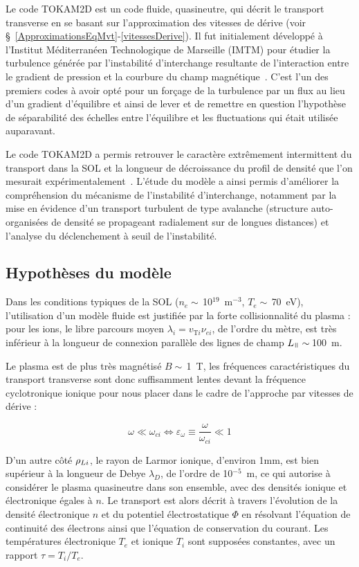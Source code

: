 \begin{refsection}
Le code TOKAM2D est un code fluide, quasineutre, qui décrit le transport
transverse en se basant sur l'approximation des vitesses de dérive (voir
\S~\ref{ApproximationsEqMvt}-\ref{vitessesDerive}). Il fut initialement
développé à l'Institut Méditerranéen Technologique de Marseille (IMTM) pour
étudier la turbulence générée par l'instabilité d'interchange resultante de
l'interaction entre le gradient de pression et la courbure du champ
magnétique~\parencite{Garbet}. C'est l'un des premiers codes à avoir opté pour
un forçage de la turbulence par un flux au lieu d'un gradient d'équilibre et
ainsi de lever et de remettre en question l'hypothèse de séparabilité
des échelles entre l'équilibre et les fluctuations qui était utilisée auparavant.

Le code TOKAM2D a permis retrouver le caractère extrêmement intermittent du
transport dans la SOL et la longueur de décroissance du profil de densité que l'on
mesurait expérimentalement~\cite{SarazinPhD}. L'étude du modèle a ainsi permis
d'améliorer la compréhension du mécanisme de l'instabilité d'interchange,
notamment par la mise en évidence d'un transport turbulent de type avalanche
(structure auto-organisées de densité se propageant radialement sur de longues
distances) et l'analyse du déclenchement à seuil de l'instabilité.

\subsection{Hypothèses du modèle}
Dans les conditions typiques de la SOL ($n_e\sim\,$10$^{19}$~m$^{-3}$,
$T_e\sim\,$70~eV), l'utilisation d'un modèle fluide est justifiée par la forte
collisionnalité du plasma : pour les ions, le libre parcours moyen
$\lambda_i=v_{\text{T}{i}} \nu_{ei}$, de l'ordre du mètre, est très
inférieur à la longueur de connexion parallèle des lignes de champ
$L_\para\sim\,$100~m.

Le plasma est de plus très magnétisé $B\sim\,$1~T, les fréquences
caractéristiques du transport transverse sont donc suffisamment lentes devant la
fréquence cyclotronique ionique pour nous placer dans le cadre de
l'approche par vitesses de dérive :

\begin{equation}
\omega\ll\omega_{ci}\Leftrightarrow
\varepsilon_\omega\equiv\frac{\omega}{\omega_{ci}}\ll 1
\end{equation}

D'un autre côté $\rho{_{Li}}$, le rayon de Larmor ionique, d'environ
1mm, est bien supérieur à la longueur de
Debye $\lambda_D$, de l'ordre de 10$^{-5}$~m, ce qui autorise à
considérer le plasma quasineutre dans son ensemble, avec des densités ionique
et électronique égales à $n$.
Le transport est alors décrit à travers l'évolution de la densité
électronique $n$ et du potentiel électrostatique $\Phi$ en résolvant l'équation
de continuité des électrons ainsi que l'équation de conservation du courant. Les
températures électronique
$T_e$ et ionique $T_i$ sont supposées constantes, avec un rapport $\tau=T_i/T_e$.


\end{refsection}
